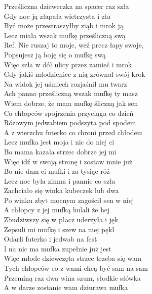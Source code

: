 
Prześliczna dzieweczka na spacer raz szła \\
Gdy noc ją złapała wietrzysta i zła \\
Być może przestraszyłby ziąb i mrok ją \\
Lecz miała wszak mufkę prześliczną swą \\
\hops
Ref. Nie ruszaj to moje, weź precz łapy swoje,\\
 Popsujesz ją boję się o mufkę swą \\
\hops
Więc szła w dół ulicy przez zamieć i mrok \\
Gdy jakiś młodzieniec z nią zrównał swój krok \\
Na widok jej uśmiech rozjaśnił mu twarz \\
Ach panno prześliczną wszak mufkę ty masz \\
\hops
Wiem dobrze, że mam mufkę śliczną jak sen \\
Co chłopców spojrzenia przyciąga co dzień \\
Różowym jedwabiem podszyta pod spodem \\
A z wierzchu futerko co chroni przed chłodem \\
\hops
Lecz mufka jest moja i nic do niej ci \\
Bo mama kazała strzec dobrze jej mi \\
Więc idź w swoją stronę i zostaw mnie już \\
Bo nie dam ci mufki i za tysiąc róż \\
\hops
Lecz noc była zimna i pannie co szła \\
Zachciało się winka kubeczek lub dwa \\
Po winku zbyt mocnym zagościł sen w niej \\
A chłopcy z jej mufką hulali że hej \\
\hops
Zbudziwszy się w płacz uderzyła i jęk \\
Zepsuli mi mufkę i szew na niej pękł \\
Odarli futerko i jedwab na fest \\
I na nic ma mufka zupełnie już jest \\
\hops
Więc młode dziewczęta strzec trzeba się wam \\
Tych chłopców co z wami chcą być sam na sam \\
Przeminą raz dwa wina szum, słodkie słówka \\
A w darze zostanie wam dziurawa mufka
